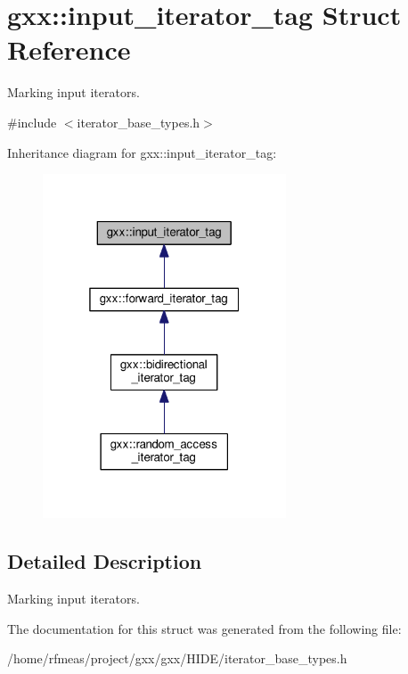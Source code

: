 \hypertarget{structgxx_1_1input__iterator__tag}{}\section{gxx\+:\+:input\+\_\+iterator\+\_\+tag Struct Reference}
\label{structgxx_1_1input__iterator__tag}


Marking input iterators.  




{\ttfamily \#include $<$iterator\+\_\+base\+\_\+types.\+h$>$}



Inheritance diagram for gxx\+:\+:input\+\_\+iterator\+\_\+tag\+:
\nopagebreak
\begin{figure}[H]
\begin{center}
\leavevmode
\includegraphics[width=205pt]{structgxx_1_1input__iterator__tag__inherit__graph}
\end{center}
\end{figure}


\subsection{Detailed Description}
Marking input iterators. 

The documentation for this struct was generated from the following file\+:\begin{DoxyCompactItemize}
\item 
/home/rfmeas/project/gxx/gxx/\+H\+I\+D\+E/iterator\+\_\+base\+\_\+types.\+h\end{DoxyCompactItemize}
